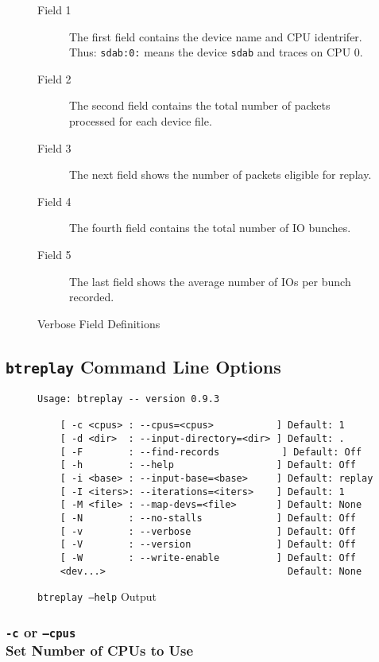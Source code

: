 \documentclass{article}
\begin{document}
\begin{figure}[h!]
\begin{description}
  \item[Field 1] The first field contains the device name and CPU
  identrifer. Thus: \texttt{sdab:0:} means the device \texttt{sdab} and
  traces on CPU 0. 

  \item[Field 2] The second field contains the total number of packets
  processed for each device file. 

  \item[Field 3] The next field shows the number of packets eligible for
  replay. 

  \item[Field 4] The fourth field contains the total number of IO bunches. 

  \item[Field 5] The last field shows the average number of IOs per bunch
  recorded.
\end{description}
\caption{\label{fig:verb-defs}Verbose Field Definitions}
\end{figure}
\FloatBarrier

\newpage\subsection{\texttt{btreplay} Command Line Options}
\begin{figure}[h!]
\begin{verbatim}
Usage: btreplay -- version 0.9.3

	[ -c <cpus> : --cpus=<cpus>           ] Default: 1
	[ -d <dir>  : --input-directory=<dir> ] Default: .
	[ -F        : --find-records           ] Default: Off
	[ -h        : --help                  ] Default: Off
	[ -i <base> : --input-base=<base>     ] Default: replay
	[ -I <iters>: --iterations=<iters>    ] Default: 1
	[ -M <file> : --map-devs=<file>       ] Default: None
	[ -N        : --no-stalls             ] Default: Off
	[ -v        : --verbose               ] Default: Off
	[ -V        : --version               ] Default: Off
	[ -W        : --write-enable          ] Default: Off
	<dev...>                                Default: None
\end{verbatim}
\caption{\label{fig:btreplay--help}\texttt{btreplay --help} Output}
\end{figure}
\FloatBarrier

\subsubsection{\label{sec:p-o-c}\texttt{-c} or
\texttt{--cpus}\\Set Number of CPUs to Use}
\end{document}
